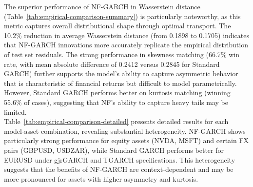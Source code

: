 \documentclass[oneside,12pt]{CUEDthesisPSnPDF}
\begin{document}
The superior performance of NF-GARCH in Wasserstein distance (Table~\ref{tab:empirical-comparison-summary}) is particularly noteworthy, as this metric captures overall distributional shape through optimal transport. The 10.2\% reduction in average Wasserstein distance (from 0.1898 to 0.1705) indicates that NF-GARCH innovations more accurately replicate the empirical distribution of test set residuals. The strong performance in skewness matching (66.7\% win rate, with mean absolute difference of 0.2412 versus 0.2845 for Standard GARCH) further supports the model's ability to capture asymmetric behavior that is characteristic of financial returns but difficult to model parametrically. However, Standard GARCH performs better on kurtosis matching (winning 55.6\% of cases), suggesting that NF's ability to capture heavy tails may be limited.\\

Table~\ref{tab:empirical-comparison-detailed} presents detailed results for each model-asset combination, revealing substantial heterogeneity. NF-GARCH shows particularly strong performance for equity assets (NVDA, MSFT) and certain FX pairs (GBPUSD, USDZAR), while Standard GARCH performs better for EURUSD under gjrGARCH and TGARCH specifications. This heterogeneity suggests that the benefits of NF-GARCH are context-dependent and may be more pronounced for assets with higher asymmetry and kurtosis.\\
\end{document}

